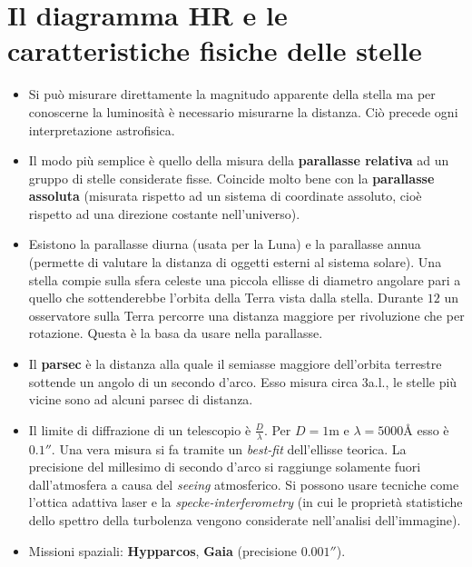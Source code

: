 \documentclass[11pt,a4paper]{article}
\begin{document}
\section{Il diagramma HR e le caratteristiche fisiche delle stelle}

\begin{itemize}

\item Si può misurare direttamente la magnitudo apparente della stella ma per conoscerne la luminosità è necessario misurarne la distanza. Ciò precede ogni interpretazione astrofisica.

\item Il modo più semplice è quello della misura della \textbf{parallasse relativa} ad un gruppo di stelle considerate fisse. Coincide molto bene con la \textbf{parallasse assoluta} (misurata rispetto ad un sistema di coordinate assoluto, cioè rispetto ad una direzione costante nell'universo).

\item Esistono la parallasse diurna (usata per la Luna) e la parallasse annua (permette di valutare la distanza di oggetti esterni al sistema solare). Una stella compie sulla sfera celeste una piccola ellisse di diametro angolare pari a quello che sottenderebbe l'orbita della Terra vista dalla stella. Durante $12$ un osservatore sulla Terra percorre una distanza maggiore per rivoluzione che per rotazione. Questa è la basa da usare nella parallasse.

\item Il \textbf{parsec} è la distanza alla quale il semiasse maggiore dell'orbita terrestre sottende un angolo di un secondo d'arco. Esso misura circa $3$a.l., le stelle più vicine sono ad alcuni parsec di distanza.

\item Il limite di diffrazione di un telescopio è $\frac{D}{\lambda}$. Per $D = 1 \si{\m}$ e $\lambda = 5000 \si{\angstrom}$ esso è $0.1''$. Una vera misura si fa tramite un \textit{best-fit} dell'ellisse teorica. La precisione del millesimo di secondo d'arco si raggiunge solamente fuori dall'atmosfera a causa del \textit{seeing} atmosferico. Si possono usare tecniche come l'ottica adattiva laser e la \textit{specke-interferometry} (in cui le proprietà statistiche dello spettro della turbolenza vengono considerate nell'analisi dell'immagine).

\item Missioni spaziali: \textbf{Hypparcos}, \textbf{Gaia} (precisione $0.001''$).


\end{itemize}
\end{document}

